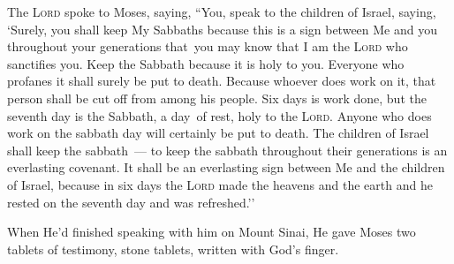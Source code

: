 
\begin{inparaenum}
    
     The \textsc{Lord} spoke to Moses, saying,%
     ``You, speak to the children of Israel, saying, `Surely, you shall keep My Sabbaths because this is a sign between Me and you throughout your generations that\understood\ you may know that I am the \textsc{Lord} who sanctifies you.%
     Keep the Sabbath because it is holy to you. Everyone who profanes it shall surely be put to death. Because whoever does work on it, that person shall be cut off from among his people.%
     Six days is work done, but the seventh day is the Sabbath, a day\understood\ of rest, holy to the \textsc{Lord}. Anyone who does work on the sabbath day will certainly be put to death.%
     The children of Israel shall keep the sabbath~--- to keep the sabbath throughout their generations is an everlasting covenant.%
     It shall be an everlasting sign between Me and the children of Israel, because in six days the \textsc{Lord} made the heavens and the earth and he rested on the seventh day and was refreshed.''%
    
     When He'd finished speaking with him on Mount Sinai, He gave Moses two tablets of testimony, stone tablets, written with God's finger.%
\end{inparaenum}
